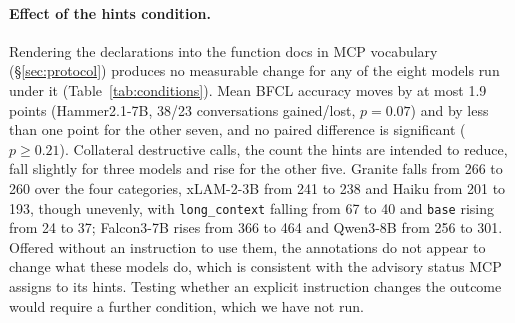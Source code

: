 \documentclass{article}
\newcommand{\cls}[1]{\texttt{#1}}
\newcommand{\Seff}{SFT\textsubscript{effects}}
\begin{document}
\paragraph{Effect of the hints condition.} Rendering the declarations into the function docs in MCP vocabulary
(\S\ref{sec:protocol}) produces no measurable change for any of the eight models run under it
(Table~\ref{tab:conditions}). Mean BFCL accuracy moves by at most 1.9 points (Hammer2.1-7B, 38/23 conversations
gained/lost, $p=0.07$) and by less than one point for the other seven, and no paired difference is significant
($p\ge0.21$). Collateral destructive calls, the count the hints are intended to reduce, fall slightly for three models and rise
for the other five. Granite falls from 266 to 260 over the four categories, xLAM-2-3B from 241 to 238 and Haiku from 201
to 193, though unevenly, with \cls{long\_context} falling from 67 to 40 and \cls{base} rising from 24 to 37; Falcon3-7B
rises from 366 to 464 and Qwen3-8B from 256 to 301.
Offered without an instruction to use them, the annotations do not appear to change what these models do, which is
consistent with the advisory status MCP assigns to its hints. Testing whether an explicit instruction changes the
outcome would require a further condition, which we have not run.
\end{document}

